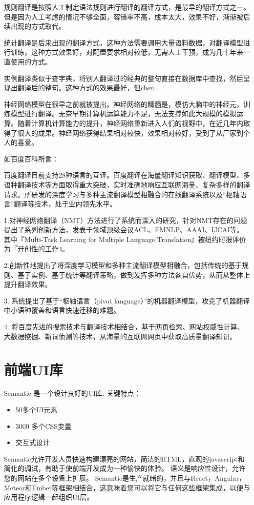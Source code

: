 \documentclass[a4paper, 11pt， oneside]{article}
\begin{document}
    规则翻译是按照人工制定语法规则进行翻译的翻译方式，是最早的翻译方式之一。但是因为人工考虑的情况不够全面，容错率不高，成本太大，效果不好，渐渐被后续出现的方式取代。

    统计翻译是后来出现的翻译方式，这种方法需要调用大量语料数据，对翻译模型进行训练，这种方式效果好，对配置要求相对较低，无需人工干预，成为几十年来一直使用的方式。

    实例翻译类似于查字典，将别人翻译过的经典的整句直接在数据库中查找，然后呈现出翻译后的整句。这种方式的效果最好，但chen

    神经网络模型在很早之前就被提出。神经网络的精髓是，模仿大脑中的神经元，训练模型进行翻译。无奈早期计算机运算能力不足，无法支撑如此大规模的模拟运算。随着计算机计算能力的提升，神经网络重新进入人们的视野中，在近几年内取得了很大的成果。神经网络获得结果相对较快，效果相对较好，受到了从厂家到个人的喜爱。

    如百度百科所言：

    百度翻译目前支持28种语言的互译。百度翻译在海量翻译知识获取、翻译模型、多语种翻译技术等方面取得重大突破，实时准确地响应互联网海量、复杂多样的翻译请求。所研发的深度学习与多种主流翻译模型相融合的在线翻译系统以及“枢轴语言”翻译等技术，处于业内领先水平。

    1.对神经网络翻译（NMT）方法进行了系统而深入的研究，针对NMT存在的问题提出了系列创新方法，发表于领域顶级会议ACL、EMNLP、AAAI、IJCAI等。其中『Multi-Task Learning for Multiple Language Translation』被纽约时报评价为『开创性的工作』。

    2.创新性地提出了将深度学习模型和多种主流翻译模型相融合，包括传统的基于规则、基于实例、基于统计等翻译策略，做到发挥多种方法各自优势，从而从整体上提升翻译效果。

    3. 系统提出了基于“枢轴语言（pivot language）”的机器翻译模型，攻克了机器翻译中小语种覆盖和语言快速迁移的难题。

    4. 将百度先进的搜索技术与翻译技术相结合，基于网页检索、网站权威性计算、大数据挖掘、新词侦测等技术，从海量的互联网网页中获取高质量翻译知识。

\section{前端UI库}
    Semantic 是一个设计良好的UI库.
    关键特点：
    \begin{itemize}
        \item 50多个UI元素
        \item 3000 多个CSS变量
        \item 交互式设计
    \end{itemize}
    Semantic允许开发人员快速构建漂亮的网站，简洁的HTML，直观的javascript和简化的调试，有助于使前端开发成为一种愉快的体验。 语义是响应性设计，允许您的网站在多个设备上扩展。 Semantic是生产就绪的，并且与React，Angular，Meteor和Ember等框架相结合，这意味着您可以将它与任何这些框架集成，以便与应用程序逻辑一起组织UI层。
\end{document}
